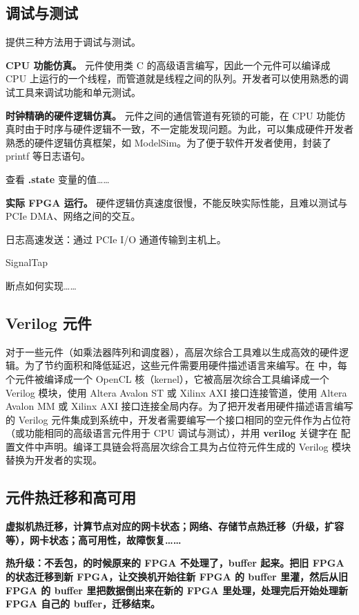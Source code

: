 \subsection{调试与测试}

\name 提供三种方法用于调试与测试。

\textbf{CPU 功能仿真。}
\name 元件使用类 C 的高级语言编写，因此一个元件可以编译成 CPU 上运行的一个线程，而管道就是线程之间的队列。开发者可以使用熟悉的调试工具来调试功能和单元测试。

\textbf{时钟精确的硬件逻辑仿真。}
元件之间的通信管道有死锁的可能，在 CPU 功能仿真时由于时序与硬件逻辑不一致，不一定能发现问题。为此，\name 可以集成硬件开发者熟悉的硬件逻辑仿真框架，如 ModelSim。为了便于软件开发者使用，\name 封装了 printf 等日志语句。

查看 \textbf{.state} 变量的值……

\textbf{实际 FPGA 运行。}
硬件逻辑仿真速度很慢，不能反映实际性能，且难以测试与 PCIe DMA、网络之间的交互。

日志高速发送：通过 PCIe I/O 通道传输到主机上。

SignalTap

断点如何实现……

\subsection{Verilog 元件}

对于一些元件（如乘法器阵列和调度器），高层次综合工具难以生成高效的硬件逻辑。为了节约面积和降低延迟，这些元件需要用硬件描述语言来编写。在 \name 中，每个元件被编译成一个 OpenCL 核（kernel），它被高层次综合工具编译成一个 Verilog 模块，使用 Altera Avalon ST 或 Xilinx AXI 接口连接管道，使用 Altera Avalon MM 或 Xilinx AXI 接口连接全局内存。为了把开发者用硬件描述语言编写的 Verilog 元件集成到系统中，开发者需要编写一个接口相同的空元件作为占位符（或功能相同的高级语言元件用于 CPU 调试与测试），并用 \textbf{verilog} 关键字在 \name 配置文件中声明。编译工具链会将高层次综合工具为占位符元件生成的 Verilog 模块替换为开发者的实现。

\subsection{元件热迁移和高可用}

\textbf{虚拟机热迁移，计算节点对应的网卡状态；网络、存储节点热迁移（升级，扩容等），网卡状态；高可用性，故障恢复……}

\textbf{热升级：不丢包，的时候原来的 FPGA 不处理了，buffer 起来。把旧 FPGA 的状态迁移到新 FPGA，让交换机开始往新 FPGA 的 buffer 里灌，然后从旧 FPGA 的 buffer 里把数据倒出来在新的 FPGA 里处理，处理完后开始处理新 FPGA 自己的 buffer，迁移结束。}

